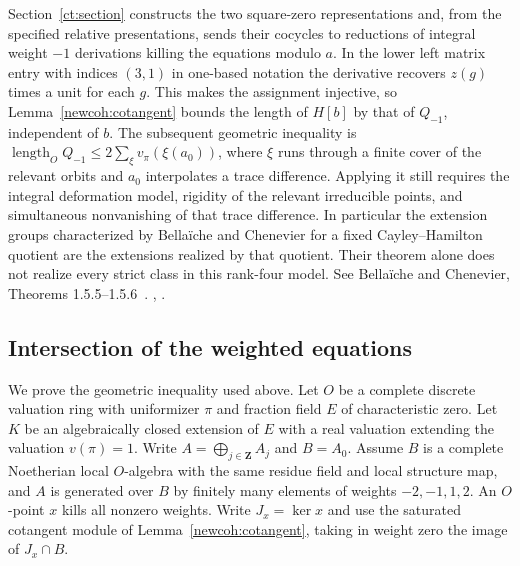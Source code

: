Section~\ref{ct:section} constructs the two square-zero representations
and, from the specified relative presentations, sends their cocycles to
reductions of integral weight \(-1\) derivations killing the equations modulo \(a\).
In the lower left matrix entry with indices \((3,1)\) in one-based
notation the derivative recovers \(z(g)\) times a unit for each \(g\).
This makes the assignment injective, so Lemma~\ref{newcoh:cotangent}
bounds the length of \(H[b]\) by that of \(Q_{-1}\), independent
of \(b\). The subsequent geometric inequality is
\(\operatorname{length}_O Q_{-1}\le2\sum_\xi v_\pi(\xi(a_0))\),
where \(\xi\) runs through a finite cover of the relevant orbits
and \(a_0\) interpolates a trace difference. Applying it still
requires the integral deformation model, rigidity of the relevant
irreducible points, and simultaneous nonvanishing of that trace
difference. In particular the extension groups characterized by
Bella\"iche and Chenevier for a fixed Cayley--Hamilton quotient
are the extensions realized by that quotient. Their theorem alone
does not realize every strict class in this rank-four model.
See Bella\"iche and Chenevier, Theorems 1.5.5--1.5.6~\cite{bellaicheChenevier}.
,
.




\subsection{Intersection of the weighted equations}
\label{newcoh:orbitsection}

We prove the geometric inequality used above. Let \(O\) be a complete
discrete valuation ring with uniformizer \(\pi\) and fraction field \(E\)
of characteristic zero. Let \(K\) be an algebraically closed extension
of \(E\) with a real valuation extending the valuation \(v(\pi)=1\).
Write \(A=\bigoplus_{j\in\mathbf Z}A_j\)
and \(B=A_0\). Assume \(B\) is a complete Noetherian local
\(O\)-algebra with the same residue field and local structure map,
and \(A\) is generated over \(B\) by finitely many elements of
weights \(-2,-1,1,2\). An \(O\)-point \(x\) kills all nonzero
weights. Write \(J_x=\ker x\) and use the saturated cotangent module
of Lemma~\ref{newcoh:cotangent}, taking in weight zero the image of
\(J_x\cap B\).

